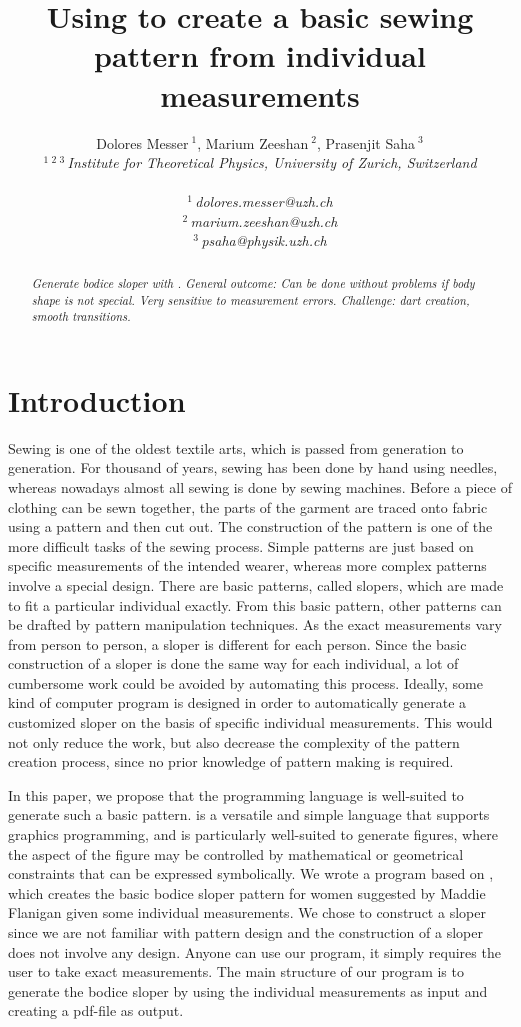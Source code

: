 \documentclass[10pt,letterpaper]{ltugboat}
\title{Using \MP { }to create a basic sewing pattern from individual measurements}
\author{%
{Dolores Messer{\small $~^{1}$}, Marium Zeeshan{\small $~^{2}$}, Prasenjit Saha{\small $~^{3}$}}%
\vspace{1.6mm}\\
\fontsize{10}{10}\selectfont\itshape
$^{1}$\,$^{2}$\,$^{3}$\,Institute for Theoretical Physics, University of Zurich, Switzerland\\
\fontsize{9}{9}\selectfont\ttfamily\upshape
\\
$^{1}$\,dolores.messer@uzh.ch\\
$^{2}$\,marium.zeeshan@uzh.ch\\
$^{3}$\,psaha@physik.uzh.ch
\vspace{1.2mm}\\
\fontsize{10}{10}\selectfont\rmfamily\itshape
}
\begin{document}
\maketitle
\lstset{language=MetaPost}
\begin{abstract} 
\textit{Generate bodice sloper with \MP. General outcome: Can be done without problems if body shape is not special. Very sensitive to measurement errors. Challenge: dart creation, smooth transitions.}
\end{abstract}

\section{Introduction}
\par Sewing is one of the oldest textile arts, which is passed from generation to generation. For thousand of years, sewing has been done by hand using needles, whereas nowadays almost all sewing is done by sewing machines. Before a piece of clothing can be sewn together, the parts of the garment are traced onto fabric using a pattern and then cut out. The construction of the pattern is one of the more difficult tasks of the sewing process. Simple patterns are just based on specific measurements of the intended wearer, whereas more complex patterns involve a special design. There are basic patterns, called slopers, which are made to fit a particular individual exactly. From this basic pattern, other patterns can be drafted by pattern manipulation techniques. As the exact measurements vary from person to person, a sloper is different for each person. Since the basic construction of a sloper is done the same way for each individual, a lot of cumbersome work could be avoided by automating this process. Ideally, some kind of computer program is designed in order to automatically generate a customized sloper on the basis of specific individual measurements. This would not only reduce the work, but also decrease the complexity of the pattern creation process, since no prior knowledge of pattern making is required.
\par In this paper, we propose that the programming language \MP { }is well-suited to generate such a basic pattern. \MP { }is a versatile and simple language that supports graphics programming, and is particularly well-suited to generate figures, where the aspect of the figure may be controlled by mathematical or geometrical constraints that can be expressed symbolically. We wrote a program based on \MP, which creates the basic bodice sloper pattern for women suggested by Maddie Flanigan \cite{maddie} given some individual measurements. We chose to construct a sloper since we are not familiar with pattern design and the construction of a sloper does not involve any design. Anyone can use our program, it simply requires the user to take exact measurements. The main structure of our program is to generate the bodice sloper by using the individual measurements as input and creating a pdf-file as output.
\end{document}
